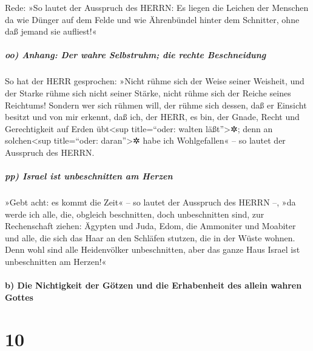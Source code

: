 Rede: »So lautet der Ausspruch des HERRN: Es liegen die
Leichen der Menschen da wie Dünger auf dem Felde und wie Ährenbündel
hinter dem Schnitter, ohne daß jemand sie aufliest!«

\hypertarget{oo-anhang-der-wahre-selbstruhm-die-rechte-beschneidung}{%
\subparagraph{oo) Anhang: Der wahre Selbstruhm; die rechte
Beschneidung}\label{oo-anhang-der-wahre-selbstruhm-die-rechte-beschneidung}}

So hat der HERR gesprochen: »Nicht rühme sich der Weise
seiner Weisheit, und der Starke rühme sich nicht seiner Stärke, nicht
rühme sich der Reiche seines Reichtums! Sondern wer sich
rühmen will, der rühme sich dessen, daß er Einsicht besitzt und von mir
erkennt, daß ich, der HERR, es bin, der Gnade, Recht und Gerechtigkeit
auf Erden übt\textless sup title=``oder: walten läßt''\textgreater✲;
denn an solchen\textless sup title=``oder: daran''\textgreater✲ habe ich
Wohlgefallen« -- so lautet der Ausspruch des HERRN.

\hypertarget{pp-israel-ist-unbeschnitten-am-herzen}{%
\subparagraph{pp) Israel ist unbeschnitten am
Herzen}\label{pp-israel-ist-unbeschnitten-am-herzen}}

»Gebt acht: es kommt die Zeit« -- so lautet der Ausspruch
des HERRN --, »da werde ich alle, die, obgleich beschnitten, doch
unbeschnitten sind, zur Rechenschaft ziehen: Ägypten und
Juda, Edom, die Ammoniter und Moabiter und alle, die sich das Haar an
den Schläfen stutzen, die in der Wüste wohnen. Denn wohl sind alle
Heidenvölker unbeschnitten, aber das ganze Haus Israel ist unbeschnitten
am Herzen!«

\hypertarget{b-die-nichtigkeit-der-guxf6tzen-und-die-erhabenheit-des-allein-wahren-gottes}{%
\paragraph{b) Die Nichtigkeit der Götzen und die Erhabenheit des allein
wahren
Gottes}\label{b-die-nichtigkeit-der-guxf6tzen-und-die-erhabenheit-des-allein-wahren-gottes}}

\hypertarget{section-9}{%
\section{10}\label{section-9}}

